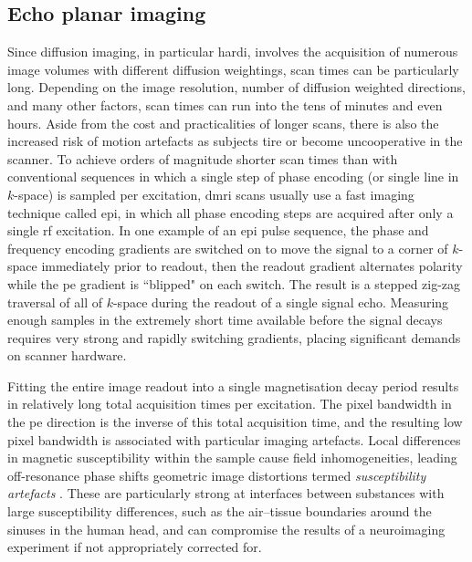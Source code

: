 \subsection{Echo planar imaging}

Since diffusion imaging, in particular \gls{hardi}, involves the acquisition of numerous image volumes with different diffusion weightings, scan times can be particularly long.
Depending on the image resolution, number of diffusion weighted directions, and many other factors, scan times can run into the tens of minutes and even hours. 
Aside from the cost and practicalities of longer scans, there is also the increased risk of motion artefacts as subjects tire or become uncooperative in the scanner.
To achieve orders of magnitude shorter scan times than with conventional sequences in which a single step of phase encoding (or single line in $k$-space) is sampled per excitation, \gls{dmri} scans usually use a fast imaging technique called \gls{epi}, in which all phase encoding steps are acquired after only a single \gls{rf} excitation.
In one example of an \gls{epi} pulse sequence, the phase and frequency encoding gradients are switched on to move the signal to a corner of $k$-space immediately prior to readout, then the readout gradient alternates polarity while the \gls{pe} gradient is ``blipped" on each switch.\autocite{Wielopolski1998}
The result is a stepped zig-zag traversal of all of $k$-space during the readout of a single signal echo.
Measuring enough samples in the extremely short time available before the signal decays requires very strong and rapidly switching gradients, placing significant demands on scanner hardware.\autocite{Bowtell1998}

Fitting the entire image readout into a single magnetisation decay period results in relatively long total acquisition times per excitation.
The pixel bandwidth in the \gls{pe} direction is the inverse of this total acquisition time, and the resulting low pixel bandwidth is associated with particular imaging artefacts.
Local differences in magnetic susceptibility within the sample cause field inhomogeneities, leading off-resonance phase shifts geometric image distortions termed \textit{susceptibility artefacts} \autocite{Fischer1998}.
These are particularly strong at interfaces between substances with large susceptibility differences, such as the air--tissue boundaries around the sinuses in the human head, and can compromise the results of a neuroimaging experiment if not appropriately corrected for.

